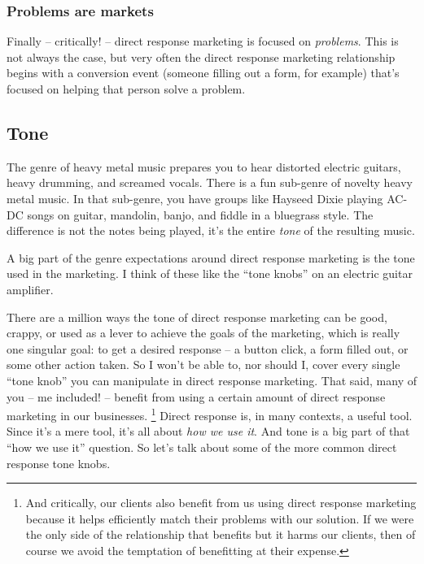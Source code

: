 \documentclass[13pt,]{tufte-handout}
\begin{document}
\hypertarget{problems-are-markets}{%
\subsubsection{Problems are markets}\label{problems-are-markets}}

Finally -- critically! -- direct response marketing is focused on
\emph{problems}. This is not always the case, but very often the direct
response marketing relationship begins with a conversion event (someone
filling out a form, for example) that's focused on helping that person
solve a problem.

\hypertarget{tone}{%
\subsection{Tone}\label{tone}}

The genre of heavy metal music prepares you to hear distorted electric
guitars, heavy drumming, and screamed vocals. There is a fun sub-genre
of novelty heavy metal music. In that sub-genre, you have groups like
Hayseed Dixie playing AC-DC songs on guitar, mandolin, banjo, and fiddle
in a bluegrass style. The difference is not the notes being played, it's
the entire \emph{tone} of the resulting music.

A big part of the genre expectations around direct response marketing is
the tone used in the marketing. I think of these like the ``tone knobs''
on an electric guitar amplifier.

There are a million ways the tone of direct response marketing can be
good, crappy, or used as a lever to achieve the goals of the marketing,
which is really one singular goal: to get a desired response -- a button
click, a form filled out, or some other action taken. So I won't be able
to, nor should I, cover every single ``tone knob'' you can manipulate in
direct response marketing. That said, many of you -- me included! --
benefit from using a certain amount of direct response marketing in our
businesses. \footnote{And critically, our clients also benefit from us
  using direct response marketing because it helps efficiently match
  their problems with our solution. If we were the only side of the
  relationship that benefits but it harms our clients, then of course we
  avoid the temptation of benefitting at their expense.} Direct response
is, in many contexts, a useful tool. Since it's a mere tool, it's all
about \emph{how we use it}. And tone is a big part of that ``how we use
it'' question. So let's talk about some of the more common direct
response tone knobs.
\end{document}
